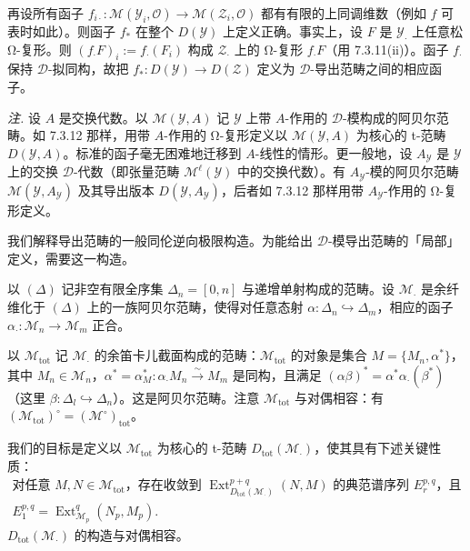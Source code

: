 
再设所有函子 $f_{i\cdot}:\mathcal{M}(\mathcal{Y}_{i},\mathcal{O})\to\mathcal{M}(\mathcal{Z}_{i},\mathcal{O})$ 都有有限的上同调维数（例如 $f$ 可表时如此）。则函子 $f_{*}$ 在整个 $D(\mathcal{Y})$ 上定义正确。事实上，设 $F$ 是 $\mathcal{Y}_{\cdot}$ 上任意松 Ω-复形。则 $(f_{\cdot}F)_{i}:=f_{\cdot}(F_{i})$ 构成 $\mathcal{Z}_{\cdot}$ 上的 Ω-复形 $f_{\cdot}F$（用 7.3.11(ii)）。函子 $f_{\cdot}$ 保持 $\mathcal{D}$-拟同构，故把 $f_{*}:D(\mathcal{Y})\to D(\mathcal{Z})$ 定义为 $\mathcal{D}$-导出范畴之间的相应函子。

 \emph{注.} 设 $A$ 是交换代数。以 $\mathcal{M}(\mathcal{Y},A)$ 记 $\mathcal{Y}$ 上带 $A$-作用的 $\mathcal{D}$-模构成的阿贝尔范畴。如 7.3.12 那样，用带 $A$-作用的 Ω-复形定义以 $\mathcal{M}(\mathcal{Y},A)$ 为核心的 t-范畴 $D(\mathcal{Y},A)$。标准的函子毫无困难地迁移到 $A$-线性的情形。更一般地，设 $A_{\mathcal{Y}}$ 是 $\mathcal{Y}$ 上的交换 $\mathcal{D}$-代数（即张量范畴 $\mathcal{M}^{\ell}(\mathcal{Y})$ 中的交换代数）。有 $A_{\mathcal{Y}}$-模的阿贝尔范畴 $\mathcal{M}(\mathcal{Y},A_{\mathcal{Y}})$ 及其导出版本 $D(\mathcal{Y},A_{\mathcal{Y}})$，后者如 7.3.12 那样用带 $A_{\mathcal{Y}}$-作用的 Ω-复形定义。


我们解释导出范畴的一般同伦逆向极限构造。为能给出 $\mathcal{D}$-模导出范畴的「局部」定义，需要这一构造。

 以 $(\Delta)$ 记非空有限全序集 $\Delta_{n}=[0,n]$ 与递增单射构成的范畴。设 $\mathcal{M}_{\cdot}$ 是余纤维化于 $(\Delta)$ 上的一族阿贝尔范畴，使得对任意态射 $\alpha:\Delta_{n}\hookrightarrow\Delta_{m}$，相应的函子 $\alpha_{\cdot}:\mathcal{M}_{n}\to\mathcal{M}_{m}$ 正合。

以 $\mathcal{M}_{\mathrm{tot}}$ 记 $\mathcal{M}_{\cdot}$ 的余笛卡儿截面构成的范畴：$\mathcal{M}_{\mathrm{tot}}$ 的对象是集合 $M=\{M_{n},\alpha^{*}\}$，其中 $M_{n}\in\mathcal{M}_{n}$，$\alpha^{*}=\alpha^{*}_{M}:\alpha_{\cdot}M_{n}\xrightarrow{\sim}M_{m}$ 是同构，且满足 $(\alpha\beta)^{*}=\alpha^{*}\alpha_{\cdot}(\beta^{*})$（这里 $\beta:\Delta_{l}\hookrightarrow\Delta_{n}$）。这是阿贝尔范畴。注意 $\mathcal{M}_{\mathrm{tot}}$ 与对偶相容：有 $(\mathcal{M}_{\mathrm{tot}})^{\circ}=(\mathcal{M}^{\circ})_{\mathrm{tot}}$。


我们的目标是定义以 $\mathcal{M}_{\mathrm{tot}}$ 为核心的 t-范畴 $D_{\mathrm{tot}}(\mathcal{M}_{\cdot})$，使其具有下述关键性质：
\begin{equation}\tag{312}
\begin{gathered}
\text{对任意 }M,N\in\mathcal{M}_{\mathrm{tot}}\text{，存在收敛到 }\operatorname{Ext}^{p+q}_{D_{\mathrm{tot}}(\mathcal{M}_{\cdot})}(N,M)\text{ 的典范谱序列 }E^{p,q}_{r}\text{，且}\\
E^{p,q}_{1}=\operatorname{Ext}^{q}_{\mathcal{M}_{p}}(N_{p},M_{p}).
\end{gathered}
\end{equation}
$D_{\mathrm{tot}}(\mathcal{M}_{\cdot})$ 的构造与对偶相容。

